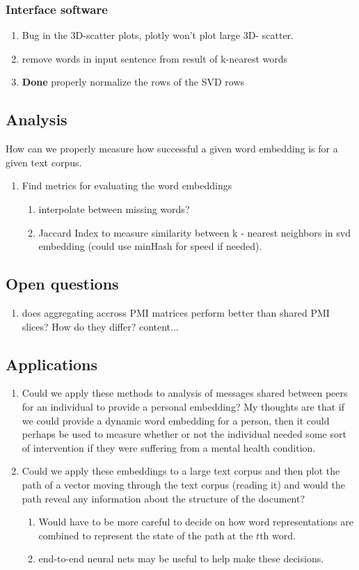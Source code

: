 \documentclass{report}
\begin{document}
		\subsubsection{Interface software}
		  \begin{enumerate}
		  	\item Bug in the 3D-scatter plots, plotly won't plot large 3D- scatter.
		  	\item remove words in input sentence from result of k-nearest words
		  	\item \textbf{Done} properly normalize the rows of the SVD rows 
		  \end{enumerate}
	\subsection{Analysis}
		How can we properly measure how successful a given word embedding is for a given text corpus. 
		\begin{enumerate}
			\item Find metrics for evaluating the word embeddings
			\begin{enumerate}
				\item interpolate between missing words?
				\item Jaccard Index to measure similarity between k - nearest neighbors in svd embedding (could use minHash for speed if needed).
			\end{enumerate}
		\end{enumerate}
	\subsection{Open questions}
	\begin{enumerate}
		\item does aggregating accross PMI matrices perform better than shared PMI slices? How do they differ? 
		content...
	\end{enumerate}
	\subsection{Applications}
	\begin{enumerate}
		\item Could we apply these methods to analysis of messages shared between peers for an individual to provide a personal embedding? My thoughts are that if we could provide a dynamic word embedding for a person, then it could perhaps be used to measure whether or not the individual needed some sort of intervention if they were suffering from a mental health condition. 
		\item Could we apply these embeddings to a large text corpus and then plot the path of a vector moving through the text corpus (reading it) and would the path reveal any information about the structure of the document? 
		\begin{enumerate}
			\item Would have to be more careful to decide on how word representations are combined to represent the state of the path at the $ t $th word.
			\item end-to-end neural nets may be useful to help make these decisions. 
		\end{enumerate}
	\end{enumerate}
    
\end{document}
